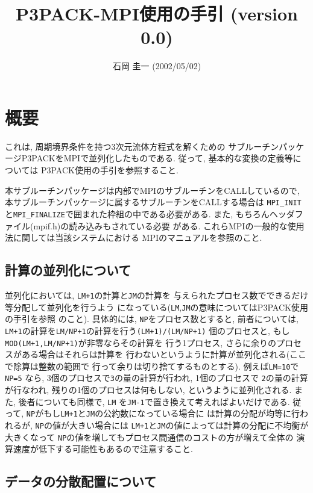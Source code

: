 \documentclass[a4j,fleqn]{jarticle}
\title{P3PACK-MPI使用の手引 (version 0.0)}
\author{石岡 圭一  (2002/05/02)}
\date{}
\begin{document}
\maketitle

\section{概要}

これは, 周期境界条件を持つ3次元流体方程式を解くための
サブルーチンパッケージP3PACKをMPIで並列化したものである.
従って, 基本的な変換の定義等については
P3PACK使用の手引を参照すること.

本サブルーチンパッケージは内部でMPIのサブルーチンをCALLしているので,
本サブルーチンパッケージに属するサブルーチンをCALLする場合は
{\tt MPI\_INIT}と{\tt MPI\_FINALIZE}で囲まれた枠組の中である必要がある.
また, もちろんヘッダファイル(mpif.h)の読み込みもされている必要
がある. これらMPIの一般的な使用法に関しては当該システムにおける
MPIのマニュアルを参照のこと.

\subsection{計算の並列化について}

並列化においては, {\tt LM+1}の計算と{\tt JM}の計算を
与えられたプロセス数でできるだけ等分配して並列化を行うよう
になっている({\tt LM},{\tt JM}の意味についてはP3PACK使用の手引を参照
のこと). 具体的には, {\tt NP}をプロセス数とすると, 前者については,
{\tt LM+1}の計算を{\tt LM/NP+1}の計算を行う{\tt (LM+1)/(LM/NP+1)}
個のプロセスと, もし{\tt MOD(LM+1,LM/NP+1)}が非零ならその計算を
行う1プロセス, さらに余りのプロセスがある場合はそれらは計算を
行わないというように計算が並列化される(ここで除算は整数の範囲で
行って余りは切り捨てするものとする). 例えば{\tt LM=10}で{\tt NP=5}
なら, 3個のプロセスで{\tt 3}の量の計算が行われ, 1個のプロセスで
{\tt 2}の量の計算が行なわれ, 残りの1個のプロセスは何もしない,
というように並列化される. また, 後者についても同様で, {\tt LM}
を{\tt JM-1}で置き換えて考えればよいだけである.
従って, {\tt NP}がもし{\tt LM+1}と{\tt JM}の公約数になっている場合に
は計算の分配が均等に行われるが, {\tt NP}の値が大きい場合には
{\tt LM+1}と{\tt JM}の値によっては計算の分配に不均衡が大きくなって
{\tt NP}の値を増してもプロセス間通信のコストの方が増えて全体の
演算速度が低下する可能性もあるので注意すること.

\subsection{データの分散配置について}
\end{document}
